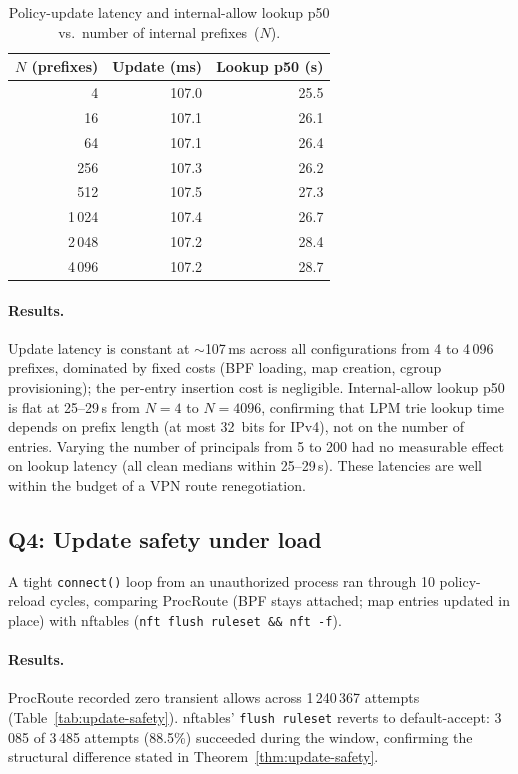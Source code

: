 \documentclass[sigconf]{acmart}
\begin{document}
\begin{table}[t]
\centering
\caption{Policy-update latency and internal-allow lookup p50
  vs.\ number of internal prefixes~($N$).}
\label{tab:scaling}
\begin{tabular}{rrr}
\toprule
$N$ (prefixes) & Update (ms) & Lookup p50 (\textmu{}s) \\
\midrule
     4   & 107.0  &  25.5  \\
    16   & 107.1  &  26.1  \\
    64   & 107.1  &  26.4  \\
   256   & 107.3  &  26.2  \\
   512   & 107.5  &  27.3  \\
 1\,024  & 107.4  &  26.7  \\
 2\,048  & 107.2  &  28.4  \\
 4\,096  & 107.2  &  28.7  \\
\bottomrule
\end{tabular}
\end{table}

\paragraph{Results.}
Update latency is constant at $\sim$107\,ms across all
configurations from 4 to 4\,096 prefixes, dominated by
fixed costs (BPF loading, map creation, cgroup provisioning);
the per-entry insertion cost is negligible.
Internal-allow lookup p50 is flat at 25--29\,\textmu{}s from
$N = 4$ to $N = 4096$, confirming that LPM trie lookup time
depends on prefix length (at most 32~bits for IPv4), not on
the number of entries.
Varying the number of principals from 5 to 200 had no
measurable effect on lookup latency (all clean medians within
25--29\,\textmu{}s).
These latencies are well within the budget of a VPN route
renegotiation.

\subsection{Q4: Update safety under load}
\label{sec:appendix:q4}

A tight \texttt{connect()} loop from an unauthorized process ran
through 10 policy-reload cycles, comparing ProcRoute (BPF stays
attached; map entries updated in place) with nftables
(\texttt{nft flush ruleset \&\& nft -f}).

\paragraph{Results.}
ProcRoute recorded zero transient allows across 1\,240\,367
attempts (Table~\ref{tab:update-safety}).
nftables' \texttt{flush ruleset} reverts to default-accept:
3\,085 of 3\,485 attempts (88.5\%) succeeded during the window,
confirming the structural difference stated in
Theorem~\ref{thm:update-safety}.
\end{document}
